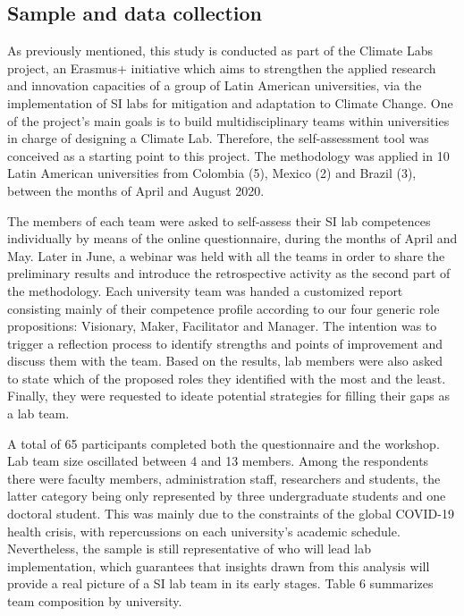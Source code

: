 \documentclass[AMA,STIX1COL,APA,STIX2COL]{WileyNJD-v2}
\begin{document}
\hypertarget{sample-and-data-collection}{%
\subsection{Sample and data
collection}\label{sample-and-data-collection}}

As previously mentioned, this study is conducted as part of the Climate
Labs project, an Erasmus+ initiative which aims to strengthen the
applied research and innovation capacities of a group of Latin American
universities, via the implementation of SI labs for mitigation and
adaptation to Climate Change. One of the project's main goals is to
build multidisciplinary teams within universities in charge of designing
a Climate Lab. Therefore, the self-assessment tool was conceived as a
starting point to this project. The methodology was applied in 10 Latin
American universities from Colombia (5), Mexico (2) and Brazil (3),
between the months of April and August 2020.

The members of each team were asked to self-assess their SI lab
competences individually by means of the online questionnaire, during
the months of April and May. Later in June, a webinar was held with all
the teams in order to share the preliminary results and introduce the
retrospective activity as the second part of the methodology. Each
university team was handed a customized report consisting mainly of
their competence profile according to our four generic role
propositions: Visionary, Maker, Facilitator and Manager. The intention
was to trigger a reflection process to identify strengths and points of
improvement and discuss them with the team. Based on the results, lab
members were also asked to state which of the proposed roles they
identified with the most and the least. Finally, they were requested to
ideate potential strategies for filling their gaps as a lab team.

A total of 65 participants completed both the questionnaire and the
workshop. Lab team size oscillated between 4 and 13 members. Among the
respondents there were faculty members, administration staff,
researchers and students, the latter category being only represented by
three undergraduate students and one doctoral student. This was mainly
due to the constraints of the global COVID-19 health crisis, with
repercussions on each university's academic schedule. Nevertheless, the
sample is still representative of who will lead lab implementation,
which guarantees that insights drawn from this analysis will provide a
real picture of a SI lab team in its early stages. Table 6 summarizes
team composition by university.
\end{document}
